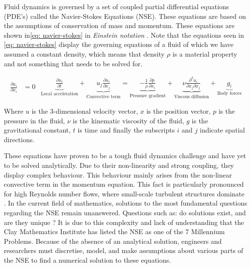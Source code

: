 \label{sect: 2.2turbflows}
Fluid dynamics is governed by a set of coupled partial differential equations (PDE's) called the Navier-Stokes Equations (NSE). These equations are based on the assumptions of conservation of mass and momentum. These equations are shown in\ref{eq: navier-stokes} in \textit{Einstein notation} \cite{Turbulence}. Note that the equations seen in \ref{eq: navier-stokes} display the governing equations of a fluid of which we have assumed a constant density, which means that density $\rho$ is a material property and not something that needs to be solved for.

\begin{subequations} \label{eq: navier-stokes}

    \begin{equation} \label{eq: continuity}
    \begin{aligned}
    \frac{\partial u_i}{\partial x_i} &= 0
    \end{aligned}
    \end{equation}

    \begin{equation} \label{eq: momentum}
    \begin{aligned}
   \underbrace{ \frac{\partial u_i}{\partial t} }_{\text{Local acceleration}}
+ 
\underbrace{ u_j \frac{\partial u_i}{\partial x_j} }_{\text{Convective term}}
= 
\underbrace{ -\frac{1}{\rho} \frac{\partial p}{\partial x_i} }_{\text{Pressure gradient}}
+ 
\underbrace{ \nu \frac{\partial^2 u_i}{\partial x_j \partial x_j} }_{\text{Viscous diffusion}}
+ 
\underbrace{ g_i }_{\text{Body forces}}
    \end{aligned}
    \end{equation}
\end{subequations}

Where $u$ is the 3-dimensional velocity vector, $x$ is the position vector, $p$ is the pressure in the fluid, $\nu$ is the kinematic viscosity of the fluid, $g$ is the gravitational constant, $t$ is time and finally the subscripts $i$ and $j$ indicate spatial directions.

These equations have proven to be a tough fluid dynamics challenge and have yet to be solved analytically. Due to their non-linearity and strong coupling, they display complex behaviour. This behaviour mainly arises from the non-linear convective term in the momentum equation. This fact is particularly pronounced for high Reynolds number flows, where small-scale turbulent structures dominate \cite{Turbulence}. In the current field of mathematics, solutions to the most fundamental questions regarding the NSE remain unanswered. Questions such as: do solutions exist, and are they unique \cite{clay_navierstokes}? It is due to this complexity and lack of understanding that the Clay Mathematics Institute has listed the NSE as one of the 7 Millennium Problems. Because of the absence of an analytical solution, engineers and researchers must discretise, model, and make assumptions about various parts of the NSE to find a numerical solution to these equations. 

